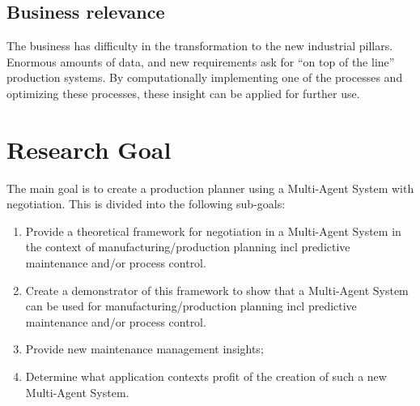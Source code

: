 \subsection{Business relevance}

The business has difficulty in the transformation to the new industrial pillars. Enormous amounts of data, and new requirements ask for ``on top of the line'' production systems. By computationally implementing one of the processes and optimizing these processes, these insight can be applied for further use.
\section{Research Goal}
The main goal is to create a production planner using a Multi-Agent System with negotiation. This is divided into the following sub-goals:
\begin{enumerate}
	\item
	Provide a theoretical framework for negotiation in a Multi-Agent System in the context of manufacturing/production planning incl predictive maintenance and/or process control.
	\item
	Create a demonstrator of this framework to show that a Multi-Agent System can be used for manufacturing/production planning incl predictive maintenance and/or process control.
	\item
	Provide new maintenance management insights;
	\item
	Determine what application contexts profit of the creation of such a new Multi-Agent System.
	
\end{enumerate} 



